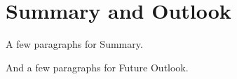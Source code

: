 \section{Summary and Outlook}

A few paragraphs for Summary.

And a few paragraphs for Future Outlook.

\pagebreak